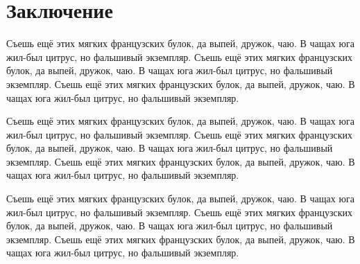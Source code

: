 \chapter*{Заключение}

Съешь ещё этих мягких французских булок, да выпей, дружок, чаю. В чащах юга жил-был цитрус, но фальшивый экземпляр. Съешь ещё этих мягких французских булок, да выпей, дружок, чаю. В чащах юга жил-был цитрус, но фальшивый экземпляр. Съешь ещё этих мягких французских булок, да выпей, дружок, чаю. В чащах юга жил-был цитрус, но фальшивый экземпляр.

Съешь ещё этих мягких французских булок, да выпей, дружок, чаю. В чащах юга жил-был цитрус, но фальшивый экземпляр. Съешь ещё этих мягких французских булок, да выпей, дружок, чаю. В чащах юга жил-был цитрус, но фальшивый экземпляр. Съешь ещё этих мягких французских булок, да выпей, дружок, чаю. В чащах юга жил-был цитрус, но фальшивый экземпляр.

Съешь ещё этих мягких французских булок, да выпей, дружок, чаю. В чащах юга жил-был цитрус, но фальшивый экземпляр. Съешь ещё этих мягких французских булок, да выпей, дружок, чаю. В чащах юга жил-был цитрус, но фальшивый экземпляр. Съешь ещё этих мягких французских булок, да выпей, дружок, чаю. В чащах юга жил-был цитрус, но фальшивый экземпляр.